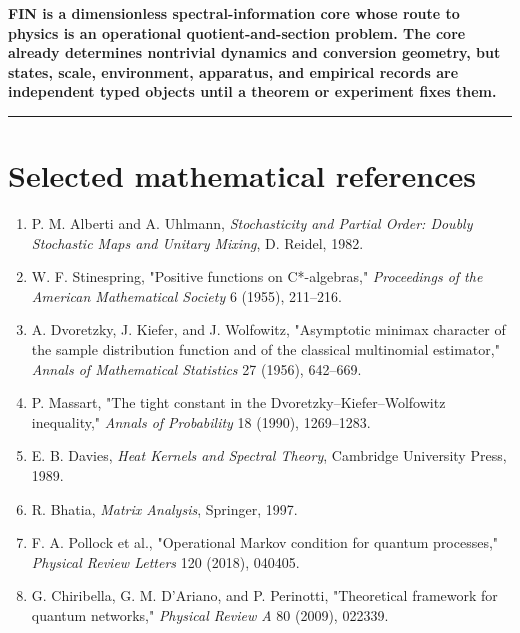 \documentclass[11pt,a4paper,openany]{report}
\begin{document}
\textbf{FIN is a dimensionless spectral-information core whose route to physics is an operational quotient-and-section problem. The core already determines nontrivial dynamics and conversion geometry, but states, scale, environment, apparatus, and empirical records are independent typed objects until a theorem or experiment fixes them.}

\par\medskip\hrule\medskip

\chapter{Selected mathematical references}

\begin{enumerate}
\item 
P. M. Alberti and A. Uhlmann, \emph{Stochasticity and Partial Order: Doubly Stochastic Maps and Unitary Mixing}, D. Reidel, 1982.

\item 
W. F. Stinespring, "Positive functions on C*-algebras," \emph{Proceedings of the American Mathematical Society} 6 (1955), 211--216.

\item 
A. Dvoretzky, J. Kiefer, and J. Wolfowitz, "Asymptotic minimax character of the sample distribution function and of the classical multinomial estimator," \emph{Annals of Mathematical Statistics} 27 (1956), 642--669.

\item 
P. Massart, "The tight constant in the Dvoretzky--Kiefer--Wolfowitz inequality," \emph{Annals of Probability} 18 (1990), 1269--1283.

\item 
E. B. Davies, \emph{Heat Kernels and Spectral Theory}, Cambridge University Press, 1989.

\item 
R. Bhatia, \emph{Matrix Analysis}, Springer, 1997.

\item 
F. A. Pollock et al., "Operational Markov condition for quantum processes," \emph{Physical Review Letters} 120 (2018), 040405.

\item 
G. Chiribella, G. M. D'Ariano, and P. Perinotti, "Theoretical framework for quantum networks," \emph{Physical Review A} 80 (2009), 022339.

\end{enumerate}
\end{document}
